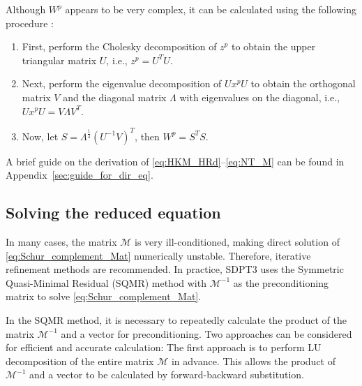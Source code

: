 \documentclass{scrartcl}
\begin{document}
Although $W^p$ appears to be very complex, it can be calculated using the following procedure \cite{todd1998}:
\begin{enumerate}
    \item First, perform the Cholesky decomposition of $z^p$ to obtain the upper triangular matrix $U$, i.e., $z^p=U^TU$.
    \item Next, perform the eigenvalue decomposition of $U x^p U$ to obtain the orthogonal matrix $V$ and the diagonal matrix $\Lambda$ with eigenvalues on the diagonal, i.e., $U x^p U = V \Lambda V^T$.
    \item Now, let $S=\Lambda^\frac{1}{4}(U^{-1}V)^T$, then $W^p=S^T S$.
\end{enumerate}

A brief guide on the derivation of \eqref{eq:HKM_HRd}--\eqref{eq:NT_M} can be found in Appendix~\ref{sec:guide_for_dir_eq}.

\subsection{Solving the reduced equation}
In many cases, the matrix $\mathcal{M}$ is very ill-conditioned, making direct solution of \eqref{eq:Schur_complement_Mat} numerically unstable. Therefore, iterative refinement methods are recommended. In practice, SDPT3 \cite{toh1999} uses the Symmetric Quasi-Minimal Residual (SQMR) method \cite{Freund1994} with $\mathcal{M}^{-1}$ as the preconditioning matrix to solve \eqref{eq:Schur_complement_Mat}.

In the SQMR method, it is necessary to repeatedly calculate the product of the matrix $\mathcal{M}^{-1}$ and a vector for preconditioning. Two approaches can be considered for efficient and accurate calculation:
The first approach is to perform LU decomposition of the entire matrix $\mathcal{M}$ in advance. This allows the product of $\mathcal{M}^{-1}$ and a vector to be calculated by forward-backward substitution.
\end{document}
